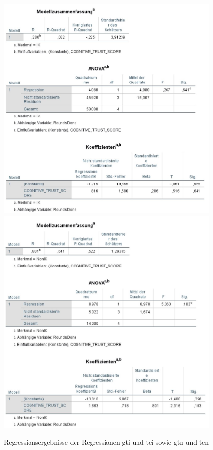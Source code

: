 \documentclass[a4paper,11pt]{article}%
\renewcommand{\\}{\vspace*{0.5\baselineskip} \newline}
\begin{document}
\begin{figure}[H]
\centering
		\begin{footnotesize}
			\includegraphics[scale=0.6]{Abbildungen/Post_QuestionnaireStatistiks/h3_regression_ik}
			\includegraphics[scale=0.6]{Abbildungen/Post_QuestionnaireStatistiks/h3_regression_nik}
			\caption{Regressionsergebnisse der Regressionen \ac{gti} und \ac{tei} sowie \ac{gtn} und \ac{ten} }
			\label{fig:h5_regression}
		\end{footnotesize}
	\end{figure}	
\end{document}

